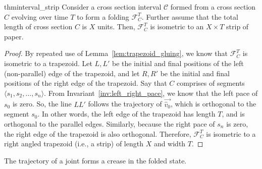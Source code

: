 \begin{restatable}{thm}{interval_strip}
\label{thm:interval_strip}
Consider a cross section interval $\mathcal C$ formed from a cross section $C$ evolving over time $T$ to form a folding $\mathcal F_C^T$.
Further assume that the total length of cross section $C$ is $X$ units. Then, $\mathcal F_C^T$ is isometric to an $X\times T$ strip of paper.
\end{restatable}
\begin{proof}
By repeated use of Lemma~\ref{lem:trapezoid_gluing}, we know that $\mathcal F_C^T$ is isometric to a trapezoid.
Let $L,L'$ be the initial and final positions of the left (non-parallel) edge of the trapezoid, and
let $R,R'$ be the initial and final positions of the right edge of the trapezoid.
Say that $C$ comprises of segments $ \langle s_1, s_2,\dots, s_n \rangle$.
From Invariant~\ref{inv:left_right_pace}, we know that the left pace of $s_0$ is zero.
So, the line $LL'$ follows the trajectory of $\vec{\hat v_0}$, which is orthogonal to the segment $s_0$.
In other words, the left edge of the trapezoid has length $T$, and is orthogonal to the parallel edges.
Similarly, because the right pace of $s_n$ is zero, the right edge of the trapezoid is also orthogonal.
Therefore, $\mathcal F_C^T$ is isometric to a right angled trapezoid (i.e., a strip) of length $X$ and width $T$.
\end{proof}

\begin{remark}
\label{rem:joint_crease}
The trajectory of a joint forms a crease in the folded state.
\end{remark}
